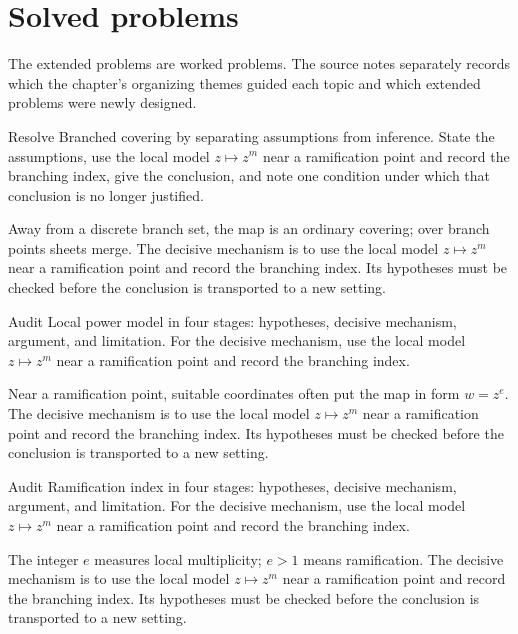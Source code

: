 \section{Solved problems}
The extended problems are worked problems. The source notes separately records which the chapter's organizing themes guided each topic and which extended problems were newly designed.

\begin{problem}\label{prob:iv24-problem-01}
Resolve Branched covering by separating assumptions from inference. State the assumptions, use the local model \(z\mapsto z^m\) near a ramification point and record the branching index, give the conclusion, and note one condition under which that conclusion is no longer justified.
\end{problem}
\begin{solution}
Away from a discrete branch set, the map is an ordinary covering; over branch points sheets merge. The decisive mechanism is to use the local model \(z\mapsto z^m\) near a ramification point and record the branching index. Its hypotheses must be checked before the conclusion is transported to a new setting.
\end{solution}

\begin{problem}\label{prob:iv24-problem-02}
Audit Local power model in four stages: hypotheses, decisive mechanism, argument, and limitation. For the decisive mechanism, use the local model \(z\mapsto z^m\) near a ramification point and record the branching index.
\end{problem}
\begin{solution}
Near a ramification point, suitable coordinates often put the map in form $w=z^e$. The decisive mechanism is to use the local model \(z\mapsto z^m\) near a ramification point and record the branching index. Its hypotheses must be checked before the conclusion is transported to a new setting.
\end{solution}

\begin{problem}\label{prob:iv24-problem-03}
Audit Ramification index in four stages: hypotheses, decisive mechanism, argument, and limitation. For the decisive mechanism, use the local model \(z\mapsto z^m\) near a ramification point and record the branching index.
\end{problem}
\begin{solution}
The integer $e$ measures local multiplicity; $e>1$ means ramification. The decisive mechanism is to use the local model \(z\mapsto z^m\) near a ramification point and record the branching index. Its hypotheses must be checked before the conclusion is transported to a new setting.
\end{solution}

